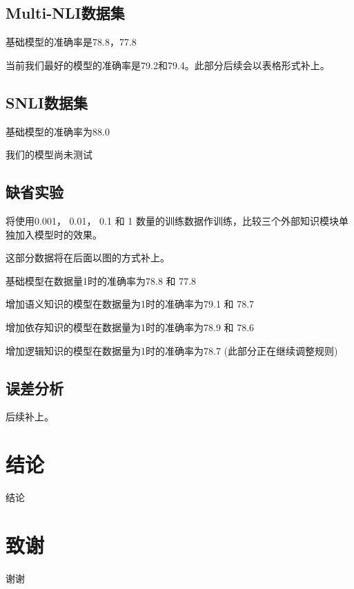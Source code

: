 \documentclass[UTF8,11pt,a4paper,nofonts]{ctexart}
\begin{document}
\subsection{Multi-NLI数据集}

基础模型的准确率是78.8，77.8

当前我们最好的模型的准确率是79.2和79.4。此部分后续会以表格形式补上。

\subsection{SNLI数据集}

基础模型的准确率为88.0

我们的模型尚未测试

\subsection{缺省实验}

将使用0.001， 0.01， 0.1 和 1 数量的训练数据作训练，比较三个外部知识模块单独加入模型时的效果。

这部分数据将在后面以图的方式补上。

基础模型在数据量1时的准确率为78.8 和 77.8

增加语义知识的模型在数据量为1时的准确率为79.1 和 78.7

增加依存知识的模型在数据量为1时的准确率为78.9 和 78.6

增加逻辑知识的模型在数据量为1时的准确率为78.7 (此部分正在继续调整规则)

\subsection{误差分析}

后续补上。



\section{结论}

结论


\section{致谢}

谢谢

\newpage
{}

\end{document}
